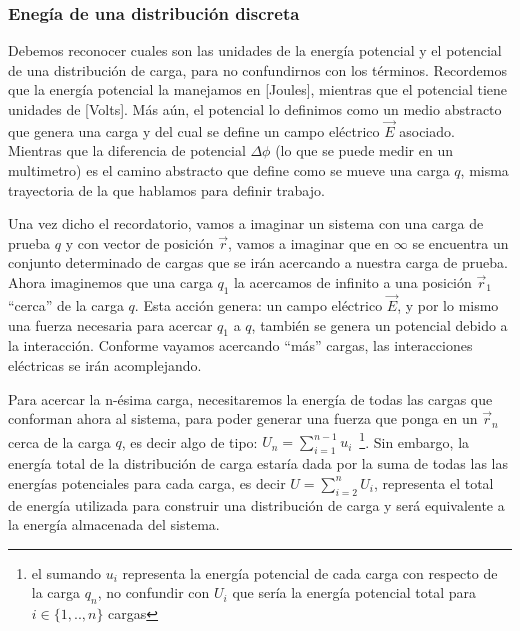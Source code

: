 \documentclass[11pt,a4paper]{article}
\begin{document}
\subsubsection{Enegía de una distribución discreta}
Debemos reconocer cuales son las unidades de la energía potencial y el potencial de una distribución de carga, para no confundirnos con los términos. Recordemos que la energía potencial la manejamos en [Joules], mientras que el potencial tiene unidades de [Volts]. Más aún, el potencial lo definimos como un medio abstracto que genera una carga y del cual se define un campo eléctrico $\vec{E}$ asociado. Mientras que la diferencia de potencial $\Delta\phi$ (lo que se puede medir en un multimetro) es el camino abstracto que define como se mueve una carga $q$, misma trayectoria de la que hablamos para definir trabajo.

Una vez dicho el recordatorio, vamos a imaginar un sistema con una carga de prueba $q$ y con vector de posición $\vec{r}$, vamos a imaginar que en $\infty$ se encuentra un conjunto determinado de cargas que se irán acercando a nuestra carga de prueba. Ahora imaginemos que una carga $q_1$ la acercamos de infinito a una posición $\vec{r}_1$ “cerca'' de la carga $q$. Esta acción genera: un campo eléctrico $\vec{E}$, y por lo mismo una fuerza necesaria para acercar $q_1$ a $q$, también se genera un potencial debido a la interacción. Conforme vayamos acercando “más'' cargas, las interacciones eléctricas se irán acomplejando.

Para acercar la n-ésima carga, necesitaremos la energía de todas las cargas que conforman ahora al sistema, para poder generar una fuerza que ponga en un $\vec{r}_n$ cerca de la carga $q$, es decir algo de tipo: $U_n=\sum_{i=1}^{n-1}u_i$\ \footnote{el sumando $u_i$ representa la energía potencial de cada carga con respecto de la carga $q_n$, no confundir con $U_i$ que sería la energía potencial total para $i\in\{1,..,n\}$ cargas}.  Sin embargo, la energía total de la distribución de carga estaría dada por la suma de todas las las energías potenciales para cada carga, es decir $U=\sum_{i=2}^{n}U_i$, representa el total de energía utilizada para construir una distribución de carga y será equivalente a la energía almacenada del sistema.
\end{document}
